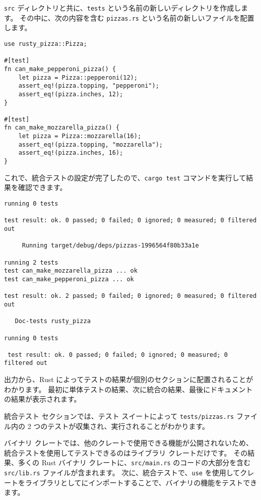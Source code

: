 \texttt{src} ディレクトリと共に、\texttt{tests} という名前の新しいディレクトリを作成します。 その中に、次の内容を含む \texttt{pizzas.rs} という名前の新しいファイルを配置します。

\begin{lstlisting}[numbers=none]
use rusty_pizza::Pizza;

#[test]
fn can_make_pepperoni_pizza() {
    let pizza = Pizza::pepperoni(12);
    assert_eq!(pizza.topping, "pepperoni");
    assert_eq!(pizza.inches, 12);
}

#[test]
fn can_make_mozzarella_pizza() {
    let pizza = Pizza::mozzarella(16);
    assert_eq!(pizza.topping, "mozzarella");
    assert_eq!(pizza.inches, 16);
}
\end{lstlisting}

これで、統合テストの設定が完了したので、\texttt{cargo test} コマンドを実行して結果を確認できます。

\begin{lstlisting}[numbers=none]
running 0 tests

test result: ok. 0 passed; 0 failed; 0 ignored; 0 measured; 0 filtered out

     Running target/debug/deps/pizzas-1996564f80b33a1e

running 2 tests
test can_make_mozzarella_pizza ... ok
test can_make_pepperoni_pizza ... ok

test result: ok. 2 passed; 0 failed; 0 ignored; 0 measured; 0 filtered out

   Doc-tests rusty_pizza

running 0 tests

 test result: ok. 0 passed; 0 failed; 0 ignored; 0 measured; 0 filtered out
\end{lstlisting}

出力から、Rust によってテストの結果が個別のセクションに配置されることがわかります。 最初に単体テストの結果、次に統合の結果、最後にドキュメントの結果が表示されます。

統合テスト セクションでは、テスト スイートによって \texttt{tests/pizzas.rs} ファイル内の 2 つのテストが収集され、実行されることがわかります。

バイナリ クレートでは、他のクレートで使用できる機能が公開されないため、統合テストを使用してテストできるのはライブラリ クレートだけです。 その結果、多くの Rust バイナリ クレートに、\texttt{src/main.rs} のコードの大部分を含む \texttt{src/lib.rs} ファイルが含まれます。 次に、統合テストで、\texttt{use} を使用してクレートをライブラリとしてにインポートすることで、バイナリの機能をテストできます。
